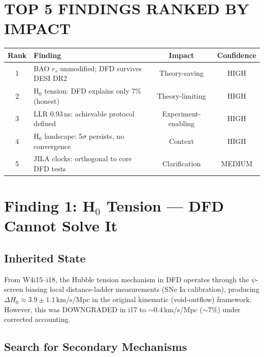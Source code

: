 \documentclass[11pt]{article}
\begin{document}
\section*{TOP 5 FINDINGS RANKED BY IMPACT}

\begin{table}[h]
\centering
\begin{tabular}{clcc}
\toprule
\textbf{Rank} & \textbf{Finding} & \textbf{Impact} & \textbf{Confidence} \\
\midrule
1 & BAO $r_s$ unmodified; DFD survives DESI DR2 & Theory-saving & HIGH \\
2 & H$_0$ tension: DFD explains only 7\% (honest) & Theory-limiting & HIGH \\
3 & LLR 0.93\,ns: achievable protocol defined & Experiment-enabling & HIGH \\
4 & H$_0$ landscape: 5$\sigma$ persists, no convergence & Context & HIGH \\
5 & JILA clocks: orthogonal to core DFD tests & Clarification & MEDIUM \\
\bottomrule
\end{tabular}
\end{table}

\section{Finding 1: H$_0$ Tension --- DFD Cannot Solve It}

\subsection{Inherited State}

From W4i15--i18, the Hubble tension mechanism in DFD operates through the
$\psi$-screen biasing local distance-ladder measurements (SNe Ia
calibration), producing $\Delta H_0 \approx 3.9 \pm 1.1$\,km/s/Mpc in
the original kinematic (void-outflow) framework. However, this was
DOWNGRADED in i17 to $\sim$0.4\,km/s/Mpc ($\sim$7\%) under corrected
accounting.

\subsection{Search for Secondary Mechanisms}
\end{document}
